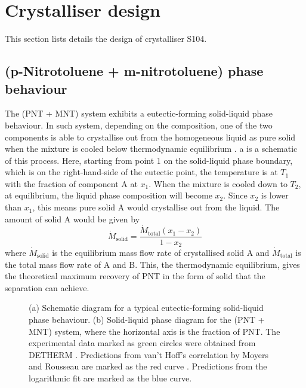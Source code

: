 \section{Crystalliser design}

This section lists details the design of crystalliser S104. 

\subsection{(p-Nitrotoluene + m-nitrotoluene) phase behaviour}

The (PNT + MNT) system exhibits a eutectic-forming solid-liquid phase behaviour. In such system, depending on the composition, one of the two components is able to crystallise out from the homogeneous liquid as pure solid when the mixture is cooled below thermodynamic equilibrium \cite{seader_separation_2011}. a is a schematic of this process. Here, starting from point 1 on the solid-liquid phase boundary, which is on the right-hand-side of the eutectic point, the temperature is at $T_1$ with the fraction of component A at $x_1$. When the mixture is cooled down to $T_2$, at equilibrium, the liquid phase composition will become $x_2$. Since $x_2$ is lower than $x_1$, this means pure solid A would crystallise out from the liquid. The amount of solid A would be given by
\begin{equation}\label{eq:amount solid A equilibrium}
    \dot{M}_{\mathrm{solid}} = \frac{\dot{M}_{\mathrm{total}} (x_1 - x_2)}{1 - x_2}
\end{equation}
where $\dot{M}_{\mathrm{solid}}$ is the equilibrium mass flow rate of crystallised solid A and $\dot{M}_{\mathrm{total}}$ is the total mass flow rate of A and B. This, the thermodynamic equilibrium, gives the theoretical maximum recovery of PNT in the form of solid that the separation can achieve.

\begin{figure}[h]
    \centering
    
    \caption{(a) Schematic diagram for a typical eutectic-forming solid-liquid phase behaviour. (b) Solid-liquid phase diagram for the (PNT + MNT) system, where the horizontal axis is the fraction of PNT. The experimental data marked as green circles were obtained from DETHERM \cite{noauthor_detherm_2021}. Predictions from van't Hoff's correlation by Moyers and Rousseau are marked as the red curve \cite{moyers_crystallization_1987}. Predictions from the logarithmic fit are marked as the blue curve.}
    \label{fig:eutectic schematic}
\end{figure}

